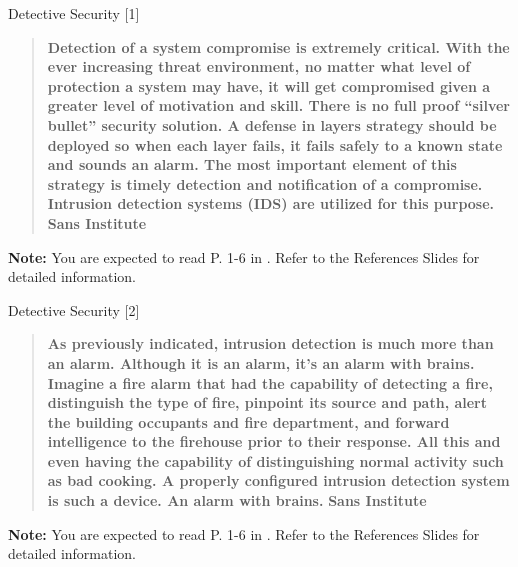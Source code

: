 \documentclass[aspectratio=169]{beamer} %
\begin{document}
\begin{frame}{Detective Security [1]}
	\begin{dBox}
		\begin{quotation}
			\noindent \textbf{Detection of a system compromise is extremely critical. With the ever increasing threat environment, no matter what level of protection a system may have, it will get compromised given a greater level of motivation and skill. There is no full proof ``silver bullet'' security solution. \textcolor{miamired}{A defense in layers strategy should be deployed so when each layer fails, it fails safely to a known state and sounds an alarm.} The most important element of this strategy is \textcolor{miamired}{timely detection and notification of a compromise}. Intrusion detection systems (IDS) are utilized for this purpose. } \textbf{Sans Institute \cite[p. 4]{sans2002info}}
		\end{quotation}
	\end{dBox}

	\EndofPage
	
	\centering \scriptsize{\textbf{Note:} You are expected to read P. 1-6 in \cite{sans2002info}. Refer to the References Slides for detailed information.}
	
	\vspace{0.5\baselineskip}
		
\end{frame}

\begin{frame}{Detective Security [2]}
	\begin{dBox}
		\begin{quotation}
			\noindent \textbf{As previously indicated, intrusion detection is much more than an alarm. Although it is an alarm, it's an \textcolor{miamired}{alarm with brains}. Imagine a fire alarm that had the capability of detecting a fire, distinguish the type of fire, pinpoint its source and path, alert the building
			occupants and fire department, and forward intelligence to the firehouse prior to their response. All this and even having the capability of distinguishing normal activity such as bad cooking. A properly configured intrusion detection system is such a device. An alarm with brains.} \textbf{Sans Institute \cite[p. 4]{sans2002info}}
		\end{quotation}
	\end{dBox}
	
	\EndofPage
	
	\centering \scriptsize{\textbf{Note:} You are expected to read P. 1-6 in \cite{sans2002info}. Refer to the References Slides for detailed information.}
	
	\vspace{0.5\baselineskip}
	
\end{frame}
\end{document}
